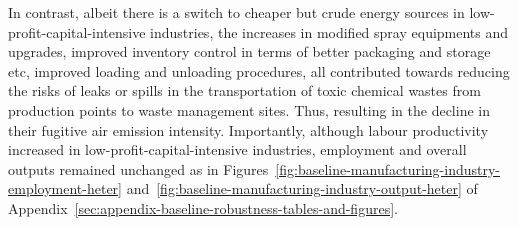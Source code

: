 \documentclass[12pt, english]{article}
\begin{document}
    In contrast, albeit there is a switch to cheaper but crude energy sources in low-profit-capital-intensive industries, the increases in modified spray equipments and upgrades, improved inventory control in terms of better packaging and storage etc, improved loading and unloading procedures, all contributed towards reducing the risks of leaks or spills in the transportation of toxic chemical wastes from production points to waste management sites. Thus, resulting in the decline in their fugitive air emission intensity. Importantly, although labour productivity increased in low-profit-capital-intensive industries, employment and overall outputs remained unchanged as in Figures~\ref{fig:baseline-manufacturing-industry-employment-heter} and~\ref{fig:baseline-manufacturing-industry-output-heter} of Appendix~\ref{sec:appendix-baseline-robustness-tables-and-figures}.
\end{document}
